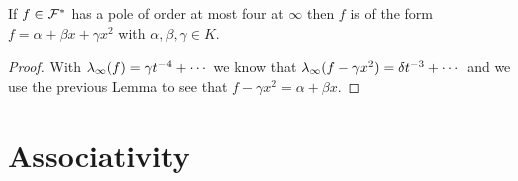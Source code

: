\documentclass[english,11pt,a4paper]{article}
\begin{document}
\begin{lemma}\label{fourpoles}
  If $f \in \mathcal{F}^*$ has a pole of order at most four at $\infty$ then $f$ is of the form $f = \alpha + \beta x + \gamma x^2$ with $\alpha, \beta, \gamma \in K$.
  \begin{proof}
    With $\lambda_{\infty} (f) = \gamma t^{-4} + \cdots$ we know that $\lambda_{\infty} (f - \gamma x^2) = \delta t^{-3} + \cdots$ and we use the previous Lemma to see that $f - \gamma x^2 = \alpha + \beta x$.
  \end{proof}
\end{lemma}


\newpage


\section{Associativity}
\end{document}
